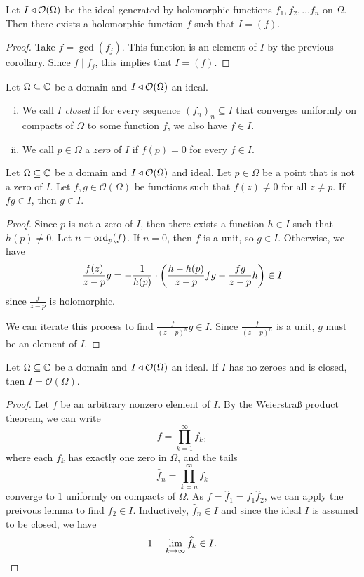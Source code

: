 \begin{izrek}
Let $I \triangleleft \mathcal{O}(\Omega)$ be the ideal generated by
holomorphic functions $f_1, f_2, \dots f_n$ on $\Omega$. Then there
exists a holomorphic function $f$ such that $I = (f)$.
\end{izrek}

\begin{proof}
Take $f = \gcd(f_j)$. This function is an element of $I$ by the
previous corollary. Since $f \mid f_j$, this implies that
$I = (f)$.
\end{proof}

\begin{definicija}
Let $\Omega \subseteq \mathbb{C}$ be a domain and
$I \triangleleft \mathcal{O}(\Omega)$ an ideal.

\begin{enumerate}[i)]
\item We call $I$ \emph{closed} if for every
sequence $(f_n)_n \subseteq I$ that converges uniformly on compacts
of $\Omega$ to some function $f$, we also have $f \in I$.
\item We call $p \in \Omega$ a \emph{zero} of $I$ if
$f(p) = 0$ for every $f \in I$.
\end{enumerate}
\end{definicija}

\begin{lema}
Let $\Omega \subseteq \mathbb{C}$ be a domain and
$I \triangleleft \mathcal{O}(\Omega)$ and ideal. Let $p \in \Omega$ be a
point that is not a zero of $I$. Let
$f, g \in \mathcal{O}(\Omega)$ be functions such that $f(z) \ne 0$
for all $z \ne p$. If $f g \in I$, then $g \in I$.
\end{lema}

\begin{proof}
Since $p$ is not a zero of $I$, then there exists a function
$h \in I$ such that $h(p) \ne 0$. Let $n = \operatorname{ord}_p(f)$. If $n=0$,
then $f$ is a unit, so $g \in I$. Otherwise, we have
\[
\frac{f(z)}{z - p}g =
-\frac{1}{h(p)} \cdot
\left(\frac{h - h(p)}{z - p} fg - \frac{f g}{z - p} h\right) \in I
\]
since $\frac{f}{z - p}$ is holomorphic.
    
We can iterate this process to find $\frac{f}{(z - p)^n} g \in I$.
Since $\frac{f}{(z - p)^n}$ is a unit, $g$ must be an element of
$I$.
\end{proof}

\begin{izrek}
Let $\Omega \subseteq \mathbb{C}$ be a domain and
$I \triangleleft \mathcal{O}(\Omega)$ an ideal. If $I$ has no zeroes and is
closed, then $I = \mathcal{O}(\Omega)$.
\end{izrek}

\begin{proof}
Let $f$ be an arbitrary nonzero element of $I$. By the Weierstraß
product theorem, we can write
\[
f = \prod_{k = 1}^{\infty} f_k,
\]
where each $f_k$ has exactly one zero in $\Omega$, and the tails
\[
\widehat{f}_n = \prod_{k = n}^{\infty} f_k
\]
converge to $1$ uniformly on compacts of $\Omega$. As
$f = \widehat{f}_1 = f_1 \widehat{f}_2$, we can apply the preivous
lemma to find $\widehat{f}_2 \in I$. Inductively,
$\widehat{f}_n \in I$ and since the ideal $I$ is assumed to be
closed, we have
\[
1 = \lim_{k \to \infty} \widehat{f}_k \in I. \qedhere
\]
\end{proof}
